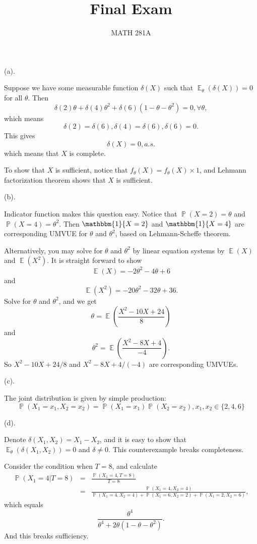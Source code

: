 \documentclass[12pt]{article}
\newenvironment{problem}[2][Problem]{\begin{trivlist}
\item[\hskip \labelsep {\bfseries #1}\hskip \labelsep {\bfseries #2.}]}{\end{trivlist}}
\newcommand{\E}{\operatorname{\mathbb{E}}}
\renewcommand{\P}{\operatorname{\mathbb{P}}}
\newcommand{\1}{\mathbbm{1}}
\begin{document}
\title{Final Exam}
\author{MATH 281A}
\maketitle
\begin{problem}{1}
\end{problem}

(a). 

Suppose we have some measurable function $\delta(X)$ such that $\E_\theta (\delta(X)) = 0$ for all $\theta$. Then
$$
\delta(2)\theta + \delta(4) \theta^2 +\delta(6) (1 - \theta -\theta^2) =0,\forall \theta,
$$
which means
$$
\delta(2) = \delta(6),\delta(4) = \delta(6) , \delta(6) =0.
$$
This gives 
$$
\delta(X) = 0, a.s.
$$
which means that $X$ is complete.

To show that $X$ is sufficient, notice that $f_\theta(X) = f_\theta(X) \times 1$, and Lehmann factorization theorem shows that $X$ is sufficient.

(b). 

Indicator function makes this question easy. Notice that $\P (X =2) = \theta$ and $\P(X = 4) =\theta^2$. Then $\1\{X=2\}$ and $\1\{X =4\}$ are corresponding UMVUE for $\theta$ and $\theta^2$, based on Lehmann-Scheffe theorem. 

Alternatively, you may solve for $\theta$ and $\theta^2$ by linear equation systems by $\E(X)$ and $\E(X^2)$. It is straight forward to show
$$
\E(X) = -2\theta^2 - 4\theta +6
$$
and 
$$
\E(X^2) = -20\theta^2 -32\theta +36.
$$
Solve for $\theta$ and $\theta^2$, and we get
$$
\theta = \E(\frac{X^2 - 10X +24}{8})
$$
and 
$$
\theta^2 = \E(\frac{X^2-8X +4}{-4}).
$$
So $X^2 - 10X +24 /8$ and $X^2-8X +4/(-4)$ are corresponding UMVUEs.

(c).

The joint distribution is given by simple production:
$$
\P (X_1=x_1,X_2=x_2) = \P(X_1=x_1)\P(X_2 = x_2), x_1,x_2 \in \{2,4,6\}
$$

(d). 

Denote $\delta(X_1, X_2) = X_1 - X_2$, and it is easy to show that $\E_\theta(\delta(X_1,X_2)) = 0$ and $\delta \neq 0$. This counterexample breaks completeness.

Consider the condition when $T = 8$, and calculate
\begin{eqnarray*}
\P(X_1=4 | T=8) &= &\frac{\P(X_1 =4, T=8)}{T=8}\\&= &\frac{\P(X_1 =4, X_2=4)}{\P(X_1 =4, X_2=4) +\P(X_1 =6, X_2=2) +\P(X_1 =2, X_2=6)},
\end{eqnarray*}
which equals
$$
\frac{\theta^4}{\theta^4 + 2\theta(1-\theta-\theta^2)}.
$$
And this breaks sufficiency.
\end{document}
